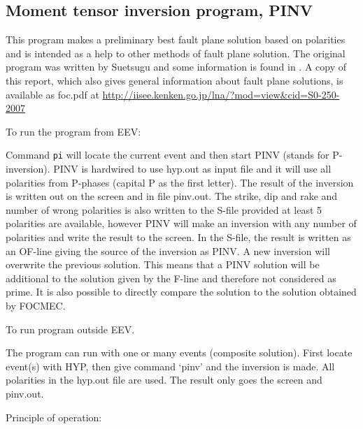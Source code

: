 \subsection{Moment tensor inversion program, PINV}
\label{PINV} 
\label{page:pinv} 

This program makes a preliminary best fault plane solution based on 
polarities and is intended as a help to other methods of fault plane 
solution. The original program was written by Suetsugu and some 
information is found in \citep{suetsugu1998}.  A copy of this report, 
which also gives general information about fault plane solutions, 
is available as foc.pdf at 
\url{http://iisee.kenken.go.jp/lna/?mod=view\&cid=S0-250-2007}

To run the program from EEV:

Command \texttt{pi} will locate the current event and then start PINV (stands for P-inversion).  PINV is hardwired to use hyp.out as input file and it will use all polarities from P-phases (capital P as the first letter). The result of the inversion is written out on the screen and in file pinv.out.  The strike, dip and rake and number of wrong polarities is also written to the S-file provided at least 5 polarities are available, however PINV will make an inversion with any number of polarities and write the result to the screen. In the S-file, the result is written as an OF-line giving the source of the inversion as PINV. A new inversion will overwrite the previous solution. This means that a PINV solution will be additional to the solution given by the F-line and therefore not considered as prime. It is also possible to directly compare the solution to the solution obtained by FOCMEC.

To run program outside EEV.

The program can run with one or many events (composite solution). First locate event(s) with HYP, then give command ‘pinv’ and the inversion is made. All polarities in the hyp.out file are used. The result only goes the screen and pinv.out.

Principle of operation:

